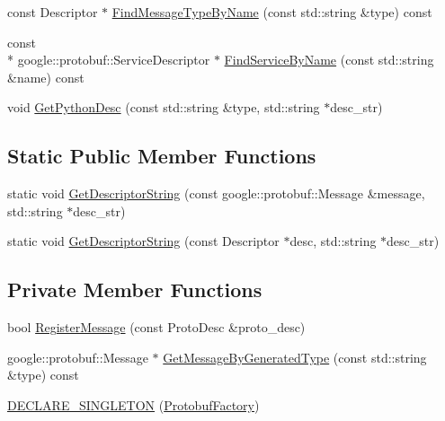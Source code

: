 \begin{DoxyCompactItemize}
\item 
const Descriptor $\ast$ \hyperlink{classapollo_1_1cyber_1_1message_1_1ProtobufFactory_a374b2b507e4eba3f9eb0ce9c192242a8}{Find\-Message\-Type\-By\-Name} (const std\-::string \&type) const 
\item 
const \\*
google\-::protobuf\-::\-Service\-Descriptor $\ast$ \hyperlink{classapollo_1_1cyber_1_1message_1_1ProtobufFactory_a665ea192ef367b2a89a769dd4f9192e6}{Find\-Service\-By\-Name} (const std\-::string \&name) const 
\item 
void \hyperlink{classapollo_1_1cyber_1_1message_1_1ProtobufFactory_a8124a5e604099823afed63e56f68a8ee}{Get\-Python\-Desc} (const std\-::string \&type, std\-::string $\ast$desc\-\_\-str)
\end{DoxyCompactItemize}
\subsection*{Static Public Member Functions}
\begin{DoxyCompactItemize}
\item 
static void \hyperlink{classapollo_1_1cyber_1_1message_1_1ProtobufFactory_aebba7fa34a0530ec76cf2fd33b3e6e3b}{Get\-Descriptor\-String} (const google\-::protobuf\-::\-Message \&message, std\-::string $\ast$desc\-\_\-str)
\item 
static void \hyperlink{classapollo_1_1cyber_1_1message_1_1ProtobufFactory_af86aa18822ec4d6bcc3fa0c3e44aa1ca}{Get\-Descriptor\-String} (const Descriptor $\ast$desc, std\-::string $\ast$desc\-\_\-str)
\end{DoxyCompactItemize}
\subsection*{Private Member Functions}
\begin{DoxyCompactItemize}
\item 
bool \hyperlink{classapollo_1_1cyber_1_1message_1_1ProtobufFactory_adb2411e8d12351e71fbfd58c3dfbc1fa}{Register\-Message} (const Proto\-Desc \&proto\-\_\-desc)
\item 
google\-::protobuf\-::\-Message $\ast$ \hyperlink{classapollo_1_1cyber_1_1message_1_1ProtobufFactory_a136d095376f83008b148dce9e58e1c78}{Get\-Message\-By\-Generated\-Type} (const std\-::string \&type) const 
\item 
\hyperlink{classapollo_1_1cyber_1_1message_1_1ProtobufFactory_a20badc63425053336d32c5db3eae9bbb}{D\-E\-C\-L\-A\-R\-E\-\_\-\-S\-I\-N\-G\-L\-E\-T\-O\-N} (\hyperlink{classapollo_1_1cyber_1_1message_1_1ProtobufFactory}{Protobuf\-Factory})
\end{DoxyCompactItemize}
